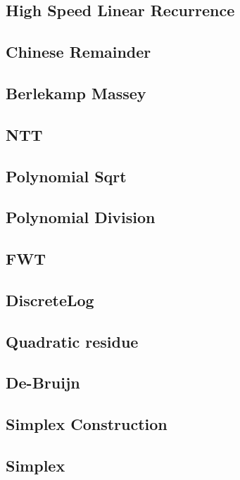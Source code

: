 \documentclass[a4paper,10pt,twocolumn,oneside]{article}
\begin{document}
\subsection{High Speed Linear Recurrence}

\subsection{Chinese Remainder}

\subsection{Berlekamp Massey}

\subsection{NTT}

\subsection{Polynomial Sqrt}

\subsection{Polynomial Division}

\subsection{FWT}

\subsection{DiscreteLog}

\subsection{Quadratic residue}

\subsection{De-Bruijn}

\subsection{Simplex Construction}

\subsection{Simplex}

\end{document}
